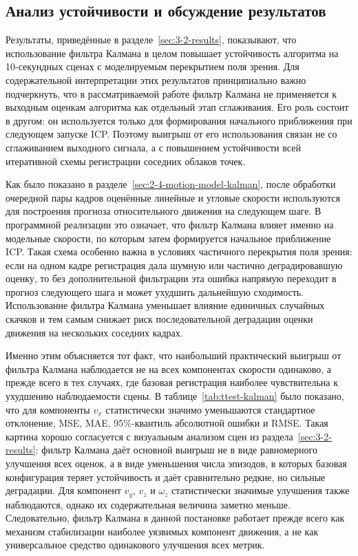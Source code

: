 \subsection{Анализ устойчивости и обсуждение результатов}
\label{sec:3-3-analysis}

Результаты, приведённые в разделе~\ref{sec:3-2-results}, показывают, что использование фильтра Калмана в целом повышает устойчивость алгоритма на 10-секундных сценах с моделируемым перекрытием поля зрения. Для содержательной интерпретации этих результатов принципиально важно подчеркнуть, что в рассматриваемой работе фильтр Калмана не применяется к выходным оценкам алгоритма как отдельный этап сглаживания. Его роль состоит в другом: он используется только для формирования начального приближения при следующем запуске ICP. Поэтому выигрыш от его использования связан не со сглаживанием выходного сигнала, а с повышением устойчивости всей итеративной схемы регистрации соседних облаков точек.

Как было показано в разделе~\ref{sec:2-4-motion-model-kalman}, после обработки очередной пары кадров оценённые линейные и угловые скорости используются для построения прогноза относительного движения на следующем шаге. В программной реализации это означает, что фильтр Калмана влияет именно на модельные скорости, по которым затем формируется начальное приближение ICP. Такая схема особенно важна в условиях частичного перекрытия поля зрения: если на одном кадре регистрация дала шумную или частично деградировавшую оценку, то без дополнительной фильтрации эта ошибка напрямую переходит в прогноз следующего шага и может ухудшить дальнейшую сходимость. Использование фильтра Калмана уменьшает влияние единичных случайных скачков и тем самым снижает риск последовательной деградации оценки движения на нескольких соседних кадрах.

Именно этим объясняется тот факт, что наибольший практический выигрыш от фильтра Калмана наблюдается не на всех компонентах скорости одинаково, а прежде всего в тех случаях, где базовая регистрация наиболее чувствительна к ухудшению наблюдаемости сцены. В таблице~\ref{tab:ttest-kalman} было показано, что для компоненты \(v_x\) статистически значимо уменьшаются стандартное отклонение, MSE, MAE, 95\%-квантиль абсолютной ошибки и RMSE. Такая картина хорошо согласуется с визуальным анализом сцен из раздела~\ref{sec:3-2-results}: фильтр Калмана даёт основной выигрыш не в виде равномерного улучшения всех оценок, а в виде уменьшения числа эпизодов, в которых базовая конфигурация теряет устойчивость и даёт сравнительно редкие, но сильные деградации. Для компонент \(v_y\), \(v_z\) и \(\omega_z\) статистически значимые улучшения также наблюдаются, однако их содержательная величина заметно меньше. Следовательно, фильтр Калмана в данной постановке работает прежде всего как механизм стабилизации наиболее уязвимых компонент движения, а не как универсальное средство одинакового улучшения всех метрик.

